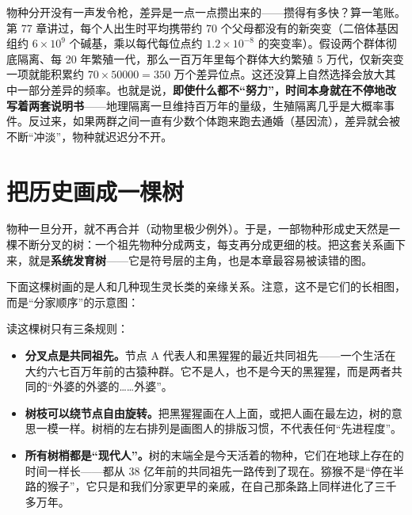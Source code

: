 \begin{qiaoliang}
物种分开没有一声发令枪，差异是一点一点攒出来的——攒得有多快？算一笔账。第 77 章讲过，每个人出生时平均携带约 70 个父母都没有的新突变（二倍体基因组约 $6\times10^{9}$ 个碱基，乘以每代每位点约 $1.2\times10^{-8}$ 的突变率）。假设两个群体彻底隔离、每 20 年繁殖一代，那么一百万年里每个群体大约繁殖 5 万代，仅新突变一项就能积累约 $70\times 50000=350$ 万个差异位点。这还没算上自然选择会放大其中一部分差异的频率。也就是说，\textbf{即使什么都不“努力”，时间本身就在不停地改写着两套说明书}——地理隔离一旦维持百万年的量级，生殖隔离几乎是大概率事件。反过来，如果两群之间一直有少数个体跑来跑去通婚（基因流），差异就会被不断“冲淡”，物种就迟迟分不开。
\end{qiaoliang}

\section{把历史画成一棵树}

物种一旦分开，就不再合并（动物里极少例外）。于是，一部物种形成史天然是一棵不断分叉的树：一个祖先物种分成两支，每支再分成更细的枝。把这套关系画下来，就是\textbf{系统发育树}——它是符号层的主角，也是本章最容易被读错的图。

下面这棵树画的是人和几种现生灵长类的亲缘关系。注意，这不是它们的长相图，而是“分家顺序”的示意图：

\begin{center}
\end{center}

读这棵树只有三条规则：

\begin{itemize}[itemsep=2pt]
\item \textbf{分叉点是共同祖先。}节点 A 代表人和黑猩猩的最近共同祖先——一个生活在大约六七百万年前的古猿种群。它不是人，也不是今天的黑猩猩，而是两者共同的“外婆的外婆的……外婆”。
\item \textbf{树枝可以绕节点自由旋转。}把黑猩猩画在人上面，或把人画在最左边，树的意思一模一样。树梢的左右排列是画图人的排版习惯，不代表任何“先进程度”。
\item \textbf{所有树梢都是“现代人”。}树的末端全是今天活着的物种，它们在地球上存在的时间一样长——都从 38 亿年前的共同祖先一路传到了现在。猕猴不是“停在半路的猴子”，它只是和我们分家更早的亲戚，在自己那条路上同样进化了三千多万年。
\end{itemize}

